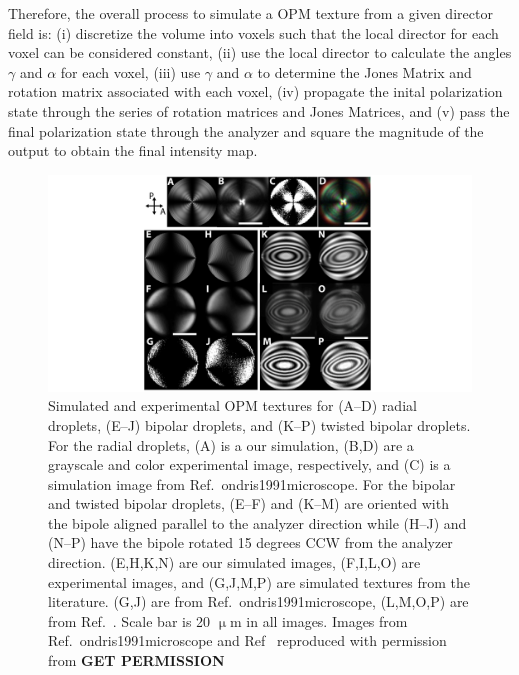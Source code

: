 Therefore, the overall process to simulate a OPM texture from a given director field is: (i) discretize the volume into voxels such that the local director for each voxel can be considered constant, (ii) use the local director to calculate the angles $\gamma$ and $\alpha$ for each voxel, (iii) use $\gamma$ and $\alpha$ to determine the Jones Matrix and rotation matrix associated with each voxel, (iv) propagate the inital polarization state through the series of rotation matrices and Jones Matrices, and (v) pass the final polarization state through the analyzer and square the magnitude of the output to obtain the final intensity map.
\begin{figure}
\centering
\includegraphics{figures/C4/Ch4-Figs_JonesSphere.png}
\caption{Simulated and experimental OPM textures for (A--D) radial droplets, (E--J) bipolar droplets, and (K--P) twisted bipolar droplets.
For the radial droplets, (A) is a our simulation, (B,D) are a grayscale and color experimental image, respectively, and (C) is a simulation image from Ref.~{ondris1991microscope}.
For the bipolar and twisted bipolar  droplets, (E--F) and (K--M) are oriented with the bipole aligned parallel to the analyzer direction while (H--J) and (N--P) have the bipole rotated 15 degrees CCW from the analyzer direction. (E,H,K,N) are our simulated images, (F,I,L,O) are experimental images, and (G,J,M,P) are simulated textures from the literature.
(G,J) are from Ref.~{ondris1991microscope}, (L,M,O,P) are from Ref.~\cite{RN193}.
Scale bar is 20 $\upmu$m in all images.
Images from Ref.~{ondris1991microscope} and Ref~\cite{RN193} reproduced with permission from {\bf GET PERMISSION}
}\label{f:4-spherecomparison}
\end{figure}

